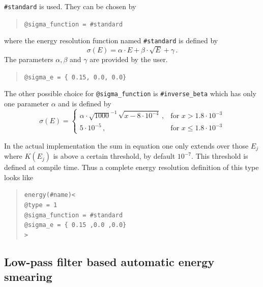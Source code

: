 {\tt \#standard} is used. They can be chosen
by
\begin{quote}
{\tt \tb @sigma\_function = \#standard}
\end{quote}
where the energy resolution function named {\tt \#standard} is defined by
\begin{equation}
\label{eq:sigma_e}
\sigma(E)=\alpha\cdot E + \beta \cdot \sqrt{E} +\gamma\,.
\end{equation}
The parameters $\alpha, \beta$ and $\gamma$ are provided by the user.
\begin{quote}
{\tt \tb @sigma\_e = \{ 0.15, 0.0, 0.0\}}
\end{quote}
The other possible choice for {\tt @sigma\_function} is {\tt \#inverse\_beta}
which has only one parameter $\alpha$ and is defined by
\begin{equation}
\sigma(E)= \left\{\begin{array}{cl}
 \alpha \cdot \sqrt{1000}^{-1}\,\sqrt{x-8\cdot10^{-4}}\,,&\mathrm{for}\,\, 
x>1.8\cdot10^{-3}\\
5\cdot10^{-5} \,,&\mathrm{for}\,\, x \leq 1.8\cdot10^{-3}
\end{array} \right.
\end{equation}


In the actual implementation 
the sum in equation one only extends over those $E_j$ where $K(E_j)$ 
is above a certain threshold, by default $10^{-7}$. This threshold is 
defined at compile time. Thus a complete energy resolution definition of this 
type looks like
\begin{quote}
{\tt energy(\#name)<\\
\tb @type = 1\\
\tb @sigma\_function = \#standard\\
\tb @sigma\_e = \{ 0.15 ,0.0 ,0.0\}\\
>
}
\end{quote}

\subsection{Low-pass filter based automatic energy smearing}

